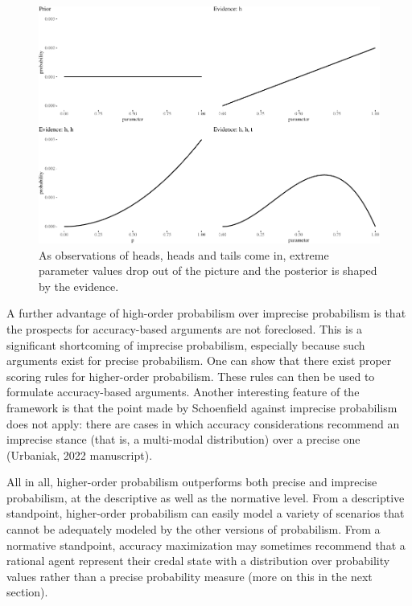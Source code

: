 \documentclass[
  10pt,
  dvipsnames,enabledeprecatedfontcommands]{scrartcl}
\begin{document}
\begin{figure}[t]

\begin{center}\includegraphics[width=0.8\linewidth]{paper-outline_files/figure-latex/fig:inertia3-1} \end{center}
\caption{As observations of heads, heads and tails come in, extreme parameter values drop out of the picture and the posterior is shaped by the evidence.}
\label{fig:intertia2}
\end{figure}

A further advantage of high-order probabilism over imprecise probabilism
is that the prospects for accuracy-based arguments are not foreclosed.
This is a significant shortcoming of imprecise probabilism, especially
because such arguments exist for precise probabilism. One can show that
there exist proper scoring rules for higher-order probabilism. These
rules can then be used to formulate accuracy-based arguments. Another
interesting feature of the framework is that the point made by
Schoenfield against imprecise probabilism does not apply: there are
cases in which accuracy considerations recommend an imprecise stance
(that is, a multi-modal distribution) over a precise one (Urbaniak, 2022
manuscript).

All in all, higher-order probabilism outperforms both precise and
imprecise probabilism, at the descriptive as well as the normative
level. From a descriptive standpoint, higher-order probabilism can
easily model a variety of scenarios that cannot be adequately modeled by
the other versions of probabilism. From a normative standpoint, accuracy
maximization may sometimes recommend that a rational agent represent
their credal state with a distribution over probability values rather
than a precise probability measure (more on this in the next section).
\end{document}
